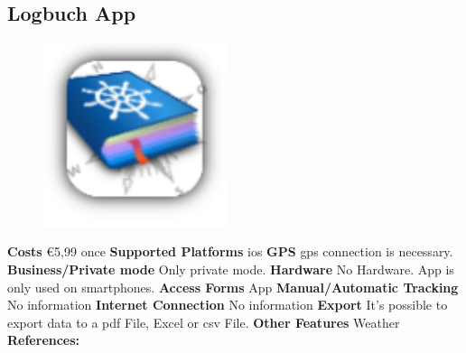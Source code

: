 \begin{singlespace}
\section{Logbuch App}
\begin{figure}
  \begin{center}
    \includegraphics[width=0.48\textwidth]{bilder/logbuchapp}
  \end{center}
\end{figure}
\textbf{Costs} \euro 5,99 once
\newline\newline
\textbf{Supported Platforms} \gls{ios}
\newline\newline
\textbf{GPS} \gls{gps} connection is necessary.
\newline\newline
\textbf{Business/Private mode} Only private mode.
\newline\newline
\textbf{Hardware} No Hardware. App is only used on smartphones.
\newline\newline
\textbf{Access Forms} App
\newline\newline
\textbf{Manual/Automatic Tracking} No information
\newline\newline
\textbf{Internet Connection} No information
\newline\newline
\textbf{Export} It’s possible to export data to a \gls{pdf} File, Excel or \gls{csv} File.
\newline\newline
\textbf{Other Features} Weather
\newline\newline
\textbf{References:} \cite{Logbuch_App}
\newpage
\clearpageauthor

\end{singlespace}
